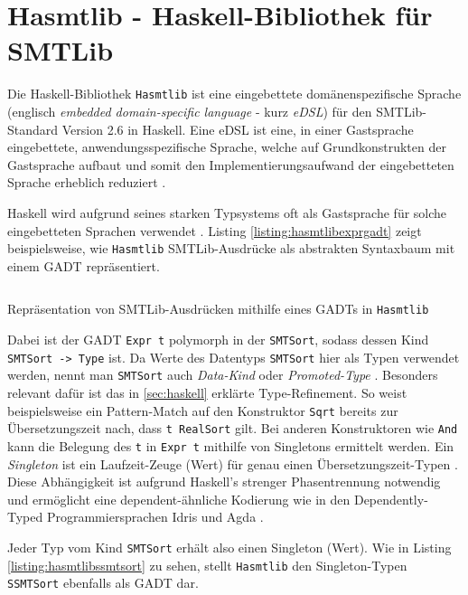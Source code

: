 \section{Hasmtlib - Haskell-Bibliothek für SMTLib}
\label{sec:hasmtlib}
Die Haskell-Bibliothek \texttt{Hasmtlib} \cite{hasmtlib} ist eine eingebettete domänenspezifische Sprache
(englisch \textit{embedded domain-specific language} - kurz \textit{eDSL}) für den SMTLib-Standard Version 2.6 \cite{smtlib} in Haskell.
Eine \gls{eDSL} ist eine, in einer Gastsprache eingebettete, anwendungsspezifische Sprache, welche auf Grundkonstrukten der Gastsprache aufbaut und somit den
Implementierungsaufwand der eingebetteten Sprache erheblich reduziert \cite{eDSL}.

Haskell wird aufgrund seines starken Typsystems oft als Gastsprache für solche eingebetteten Sprachen verwendet \cite{eDSL2}.
Listing \ref{listing:hasmtlibexprgadt} zeigt beispielsweise, wie \texttt{Hasmtlib} SMTLib-Ausdrücke als abstrakten Syntaxbaum mit einem GADT repräsentiert.

\begin{listing}[H]
    \inputminted[linenos=true]{haskell}{Code/Implementierung/Hasmtlib/ExprGADT.hs}
    \caption{Repräsentation von SMTLib-Ausdrücken mithilfe eines GADTs in \texttt{Hasmtlib} \cite{hasmtlibExpr}}
    \label{listing:hasmtlibexprgadt}
\end{listing}

Dabei ist der GADT \texttt{Expr t} polymorph in der \texttt{SMTSort}, sodass dessen Kind \texttt{SMTSort -> Type} ist.
Da Werte des Datentyps \texttt{SMTSort} hier als Typen verwendet werden, nennt man \texttt{SMTSort} auch \textit{Data-Kind} oder \textit{Promoted-Type} \cite{singletons}.
Besonders relevant dafür ist das in \ref{sec:haskell} erklärte Type-Refinement.
So weist beispielsweise ein Pattern-Match auf den Konstruktor \texttt{Sqrt} bereits zur Übersetzungszeit nach, dass \texttt{t \raisebox{-0.6ex}{\textasciitilde} RealSort} gilt.
Bei anderen Konstruktoren wie \texttt{And} kann die Belegung des \texttt{t} in \texttt{Expr t} mithilfe von Singletons ermittelt werden.
Ein \textit{\gls{Singleton}} ist ein Laufzeit-Zeuge (Wert) für genau einen Übersetzungszeit-Typen \cite{singletons}.
Diese Abhängigkeit ist aufgrund Haskell's strenger Phasentrennung notwendig und ermöglicht eine dependent-ähnliche Kodierung
wie in den Dependently-Typed Programmiersprachen Idris \cite{idris} und Agda \cite{agda}.

Jeder Typ vom Kind \texttt{SMTSort} erhält also einen Singleton (Wert).
Wie in Listing \ref{listing:hasmtlibssmtsort} zu sehen, stellt \texttt{Hasmtlib} den Singleton-Typen \texttt{SSMTSort} ebenfalls als GADT dar.

